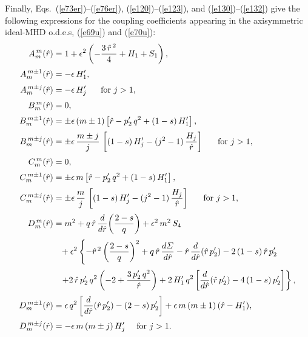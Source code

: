 \documentclass[12pt,prb,aps]{revtex4-1}
\begin{document}
Finally, Eqs.~(\ref{e73er})--(\ref{e76er}), (\ref{e120})--(\ref{e123}), and (\ref{e130})--(\ref{e132}) give the following expressions for the coupling coefficients appearing
in the axisymmetric ideal-MHD o.d.e.s, (\ref{e69u}) and (\ref{e70u}): 
\begin{align}
A_m^{\,m}(\hat{r}) &= 1 + \epsilon^2\left(-\frac{3\,\hat{r}^{\,2}}{4} + H_1+S_1\right),\\[0.5ex]
A_m^{\,m\pm 1}(\hat{r}) &= - \epsilon\,H_1',\\[0.5ex]
A_m^{\,m\pm j}(\hat{r}) &= -\epsilon\,H_j'~~~~~\mbox{for $j>1$},\\[0.5ex]
B_m^{\,m}(\hat{r}) &= 0,\\[0.5ex]
B_m^{\,m\pm 1}(\hat{r}) &= \pm \epsilon\,(m\pm 1)\left[\hat{r}-p_2'\,q^2+(1-s)\,H_1'\right],\\[0.5ex]
B_m^{\,m\pm j}(\hat{r}) &= \pm\epsilon\,\frac{m\pm j}{j}\,\left[(1-s)\,H_j'- (j^2-1)\,\frac{H_j}{\hat{r}}\right]~~~~~\mbox{for $j>1$},\\[0.5ex]
C_m^{\,m}(\hat{r}) &= 0,\\[0.5ex]
C_m^{\,m\pm 1}(\hat{r}) &= \pm \epsilon\,m\left[\hat{r}-p_2'\,q^2+(1-s)\,H_1'\right],\\[0.5ex]
C_m^{\,m\pm j}(\hat{r}) &= \pm\epsilon\,\frac{m}{j}\,\left[(1-s)\,H_j'- (j^2-1)\,\frac{H_j}{\hat{r}}\right]~~~~~\mbox{for $j>1$},\\[0.5ex]
D_m^{\,m}(\hat{r}) &= m^2 + q\,\hat{r}\,\frac{d}{d\hat{r}}\!\left(\frac{2-s}{q}\right) +\epsilon^2\,m^2\,S_4\nonumber\\[0.5ex]
&\phantom{=}+\epsilon^2\left\{-\hat{r}^{\,2}\left(\frac{2-s}{q}\right)^2+q\,\hat{r}\,\frac{d{\mit\Sigma}}{d\hat{r}}- \hat{r}\,\frac{d}{d\hat{r}}(\hat{r}\,p_2') -2\,(1-s)\,\hat{r}\,p_2'
\right.\nonumber\\[0.5ex]
&\phantom{=}\left.+2\,\hat{r}\,p_2'\,q^2\left(-2 + \frac{3\,p_2'\,q^2}{\hat{r}}\right) + 2\,H_1'\,q^2\left[\frac{d}{d\hat{r}}(\hat{r}\,p_2')-4\,(1-s)\,p_2'\right]\right\},\\[0.5ex]
D_m^{\,m\pm 1}(\hat{r}) &=\epsilon\,q^2\left[\frac{d}{d\hat{r}}(\hat{r}\,p_2') - (2-s)\,p_2'\right] + \epsilon\,m\,(m\pm 1)\,(\hat{r}-H_1'),\\[0.5ex]
D_m^{\,m\pm j}(\hat{r}) &= -\epsilon\,m\,(m\pm j)\,H_j'~~~~\mbox{for $j>1$}.
\end{align}
\end{document}
